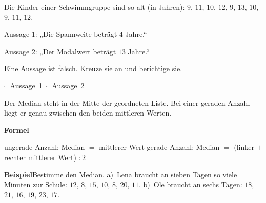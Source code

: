 \documentclass[11pt]{article}
\makeatletter
\renewcommand{\kreuz}[1]{\mbox{$\square$\ #1}\quad}
\newcommand{\aufg}[3]{\par\noindent\makebox[0pt][r]{#3}\begin{minipage}[t]{\linewidth}#1\end{minipage}\par}
\newcommand{\nr}[1]{\makebox[7mm][l]{\textbf{#1}}}
\newlength{\kr}
\newcommand{\karomerk}[2]{\protected@write\@auxout{}{\string\karoseite{#1}{#2}{\thepage}}}
\newcommand{\karoseite}[3]{\expandafter\xdef\csname karo@#1@#2\endcsname{#3}}
\makeatother
\begin{document}
\medskip
\aufg{\nr{4.}Die Kinder einer Schwimmgruppe sind so alt (in Jahren): $9$, $11$, $10$, $12$, $9$, $13$, $10$, $9$, $11$, $12$.\par Aussage 1: „Die Spannweite beträgt $4$ Jahre.“\par Aussage 2: „Der Modalwert beträgt $13$ Jahre.“\par Eine Aussage ist falsch. Kreuze sie an und berichtige sie.\par\smallskip\leftskip7mm \kreuz{Aussage 1}\ \kreuz{Aussage 2}}{}{{\scriptsize\color{mbgrau}Ziel\hspace{2mm}}}
\medskip
\par\vspace{3mm}\setlength{\kr}{\dimexpr\pagegoal-\pagetotal-10mm\relax}%
\ifdim\kr>12mm\karomerk{k}{A}\noindent{\scriptsize\color{mbgrau}Platz zum Rechnen}\par\nointerlineskip\vspace{1mm}\noindent
\begin{tikzpicture}\clip (0,0) rectangle ({\linewidth-0.5mm},\kr);\draw[black!16,line width=0.3pt,step=5mm] (0,0) grid (\linewidth,\kr);\end{tikzpicture}\fi\par
\clearpage\label{s:B}\noindent\colorbox{black!12}{}\hspace{3mm}{\Large\bfseries Median}\par\smallskip
\noindent Der Median steht in der Mitte der geordneten Liste. Bei einer geraden Anzahl liegt er genau zwischen den beiden mittleren Werten.\par\medskip
\noindent\textbf{Formel}\par\nopagebreak\noindent\hspace*{4mm}\begin{minipage}{\dimexpr\linewidth-4mm\relax}ungerade Anzahl: Median $=$ mittlerer Wert \newline gerade Anzahl: Median $=$ (linker $+$ rechter mittlerer Wert) $: 2$\end{minipage}\par\medskip
\noindent\textbf{Beispiel}\quad Bestimme den Median. a)~Lena braucht an sieben Tagen so viele Minuten zur Schule: $12$, $8$, $15$, $10$, $8$, $20$, $11$. b)~Ole braucht an sechs Tagen: $18$, $21$, $16$, $19$, $23$, $17$.\par\smallskip
\end{document}
